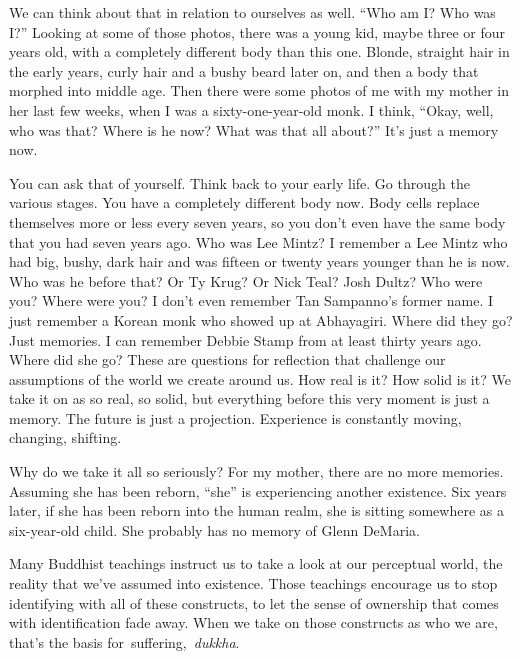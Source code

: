 We can think about that in relation to ourselves as well. ``Who am I? Who was I?'' Looking at some of those photos, there was a young kid, maybe three or four years old, with a completely different body than this one. Blonde, straight hair in the early years, curly hair and a bushy beard later on, and then a body that morphed into middle age. Then there were some photos of me with my mother in her last few weeks, when I was a sixty-one-year-old monk. I think, ``Okay, well, who was that? Where is he now? What was that all about?'' It's just a memory now.

You can ask that of yourself. Think back to your early life. Go through the various stages. You have a completely different body now. Body cells replace themselves more or less every seven years, so you don't even have the same body that you had seven years ago. Who was Lee Mintz? I remember a Lee Mintz who had big, bushy, dark hair and was fifteen or twenty years younger than he is now. Who was he before that? Or Ty Krug? Or Nick Teal? Josh Dultz? Who were you? Where were you? I don't even remember Tan Sampanno's former name. I just remember a Korean monk who showed up at Abhayagiri. Where did they go? Just memories. I can remember Debbie Stamp from at least thirty years ago. Where did she go? These are questions for reflection that challenge our assumptions of the world we create around us. How real is it? How solid is it? We take it on as so real, so solid, but everything before this very moment is just a memory. The future is just a projection. Experience is constantly moving, changing, shifting.

\enlargethispage{-1\baselineskip}
Why do we take it all so seriously? For my mother, there are no more memories. Assuming she has been reborn, ``she'' is experiencing another existence. Six years later, if she has been reborn into the human realm, she is sitting somewhere as a six-year-old child. She probably has no memory of Glenn DeMaria.

Many Buddhist teachings instruct us to take a look at our perceptual world, the reality that we've assumed into existence. Those teachings encourage us to stop identifying with all of these constructs, to let the sense of ownership that comes with identification fade away. When we take on those constructs as who we are, that's the basis \mbox{for suffering, \emph{dukkha}.}

